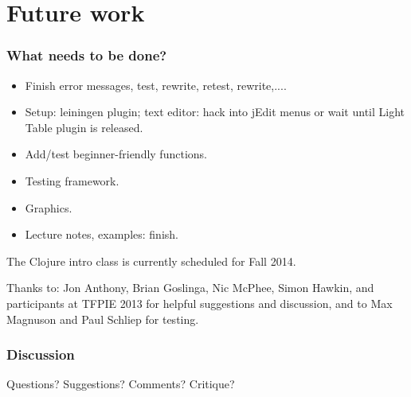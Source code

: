 \documentclass{beamer}
\begin{document}
\section{Future work}

\begin{frame}
  \frametitle{What needs to be done?}
\begin{itemize}
\item Finish error messages, test, rewrite, retest, rewrite,....
\item Setup: leiningen plugin; text editor: hack into jEdit menus or wait until Light Table plugin is released.
\item Add/test beginner-friendly functions. 
\item Testing framework.
\item Graphics. 
\item Lecture notes, examples: finish. 
\end{itemize}
The Clojure intro class is currently scheduled for Fall 2014. 

\vspace{.05in}

Thanks to: Jon Anthony, Brian Goslinga, Nic McPhee, Simon Hawkin, and participants at TFPIE 2013 for helpful suggestions and discussion, and to Max Magnuson and Paul Schliep for testing. 
\end{frame}



\begin{frame}
  \frametitle{Discussion}
Questions? Suggestions? Comments? Critique? 
\end{frame}
\end{document}
